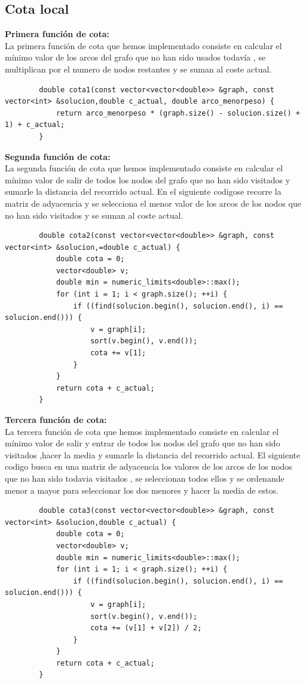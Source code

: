 \documentclass[11pt,openany]{book}
\begin{document}
\subsection{Cota local}
\textbf{Primera función de cota:} \\
    La primera función de cota que hemos implementado consiste en calcular el mínimo valor de los arcos del grafo que no han sido 
    usados todavía , se multiplican por el numero de nodos restantes y se suman al coste actual.
    \begin{lstlisting}
        double cota1(const vector<vector<double>> &graph, const vector<int> &solucion,double c_actual, double arco_menorpeso) {
            return arco_menorpeso * (graph.size() - solucion.size() + 1) + c_actual;
        }

    \end{lstlisting}
\textbf{Segunda función de cota:} \\
    La segunda función de cota que hemos implementado consiste en calcular el mínimo valor de salir de todos los nodos del grafo que no 
    han sido visitados y sumarle la distancia del recorrido actual.
    En el siguiente codigose recorre la matriz de adyacencia y se selecciona el menor valor de los arcos de los nodos que no han sido visitados 
    y se suman al coste actual.
    \begin{lstlisting}
        double cota2(const vector<vector<double>> &graph, const vector<int> &solucion,=double c_actual) {
            double cota = 0;
            vector<double> v;
            double min = numeric_limits<double>::max();
            for (int i = 1; i < graph.size(); ++i) {
                if ((find(solucion.begin(), solucion.end(), i) == solucion.end())) {
                    v = graph[i];
                    sort(v.begin(), v.end());
                    cota += v[1];
                }
            }
            return cota + c_actual;
        }
    \end{lstlisting}
    \textbf{Tercera función de cota:} \\
    La tercera función de cota que hemos implementado consiste en calcular el mínimo valor de salir y entrar  de todos los nodos del grafo que no 
    han sido visitados ,hacer la media  y sumarle la distancia del recorrido actual.
    El siguiente codigo busca en una matriz de adyacencia los valores de los arcos de los nodos que no han sido todavia visitados , se 
    seleccionan todos ellos y se ordenande menor a mayor para seleccionar los dos menores y hacer la media de estos.
    \begin{lstlisting}
        double cota3(const vector<vector<double>> &graph, const vector<int> &solucion,double c_actual) {
            double cota = 0;
            vector<double> v;
            double min = numeric_limits<double>::max();
            for (int i = 1; i < graph.size(); ++i) {
                if ((find(solucion.begin(), solucion.end(), i) == solucion.end())) {
                    v = graph[i];
                    sort(v.begin(), v.end());
                    cota += (v[1] + v[2]) / 2;
                }
            }
            return cota + c_actual;
        }
    \end{lstlisting}
\end{document}
